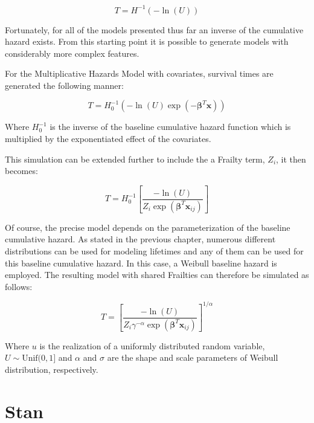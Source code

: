 $$ T = H^{-1}(-\ln(U)) $$

Fortunately, for all of the models presented thus far an inverse of the cumulative hazard exists. From this starting point it is possible to generate models with considerably more complex features.

For the Multiplicative Hazards Model with covariates, survival times are generated the following manner\cite{Bender2005}:

$$ T = H_0^{-1}(-\ln(U) \exp(-\boldsymbol\beta^T \textbf{x})) $$

Where $H_0^{-1}$ is the inverse of the baseline cumulative hazard function which is multiplied by the exponentiated effect of the covariates. 

This simulation can be extended further to include the a Frailty term, $Z_i$, it then becomes\cite{Romdhane2015}:

$$ T = H_0^{-1}\left [\frac{-\ln(U)}{Z_{i} \exp(\boldsymbol\beta^T \textbf{x}_{ij})}  \right ] $$




Of course, the precise model depends on the parameterization of the baseline cumulative hazard. As stated in the previous chapter, numerous different distributions can be used for modeling lifetimes and any of them can be used for this baseline cumulative hazard. In this case, a Weibull baseline hazard is employed. The resulting model with shared Frailties can therefore be simulated as follows:

$$T = \left [\frac{- \ln(U) }{Z_{i} \gamma^{-\alpha}  \exp(\boldsymbol\beta^T \textbf{x}_{ij})}  \right ]^{1/\alpha} $$

Where $u$ is the realization of a uniformly distributed random variable, $U \sim \text{Unif}(0,1]$ and $\alpha$ and $\sigma$ are the shape and scale parameters of Weibull distribution, respectively.







\section*{Stan}

